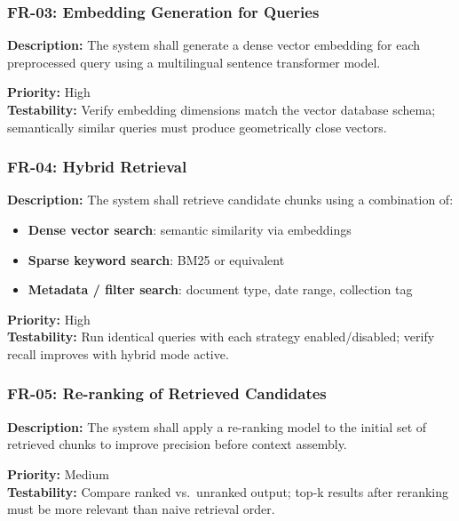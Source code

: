 \documentclass[
  11pt,
]{article}
\providecommand{\tightlist}{%
  \setlength{\itemsep}{0pt}\setlength{\parskip}{0pt}}
\begin{document}
\subsubsection{FR-03: Embedding Generation for
Queries}\label{fr-03-embedding-generation-for-queries}

\textbf{Description:} The system shall generate a dense vector embedding
for each preprocessed query using a multilingual sentence transformer
model.

\textbf{Priority:} High\\
\textbf{Testability:} Verify embedding dimensions match the vector
database schema; semantically similar queries must produce geometrically
close vectors.

\subsubsection{FR-04: Hybrid Retrieval}\label{fr-04-hybrid-retrieval}

\textbf{Description:} The system shall retrieve candidate chunks using a
combination of:

\begin{itemize}
\tightlist
\item
  \textbf{Dense vector search}: semantic similarity via embeddings
\item
  \textbf{Sparse keyword search}: BM25 or equivalent
\item
  \textbf{Metadata / filter search}: document type, date range,
  collection tag
\end{itemize}

\textbf{Priority:} High\\
\textbf{Testability:} Run identical queries with each strategy
enabled/disabled; verify recall improves with hybrid mode active.

\subsubsection{FR-05: Re-ranking of Retrieved
Candidates}\label{fr-05-re-ranking-of-retrieved-candidates}

\textbf{Description:} The system shall apply a re-ranking model to the
initial set of retrieved chunks to improve precision before context
assembly.

\textbf{Priority:} Medium\\
\textbf{Testability:} Compare ranked vs.~unranked output; top-k results
after reranking must be more relevant than naive retrieval order.
\end{document}
